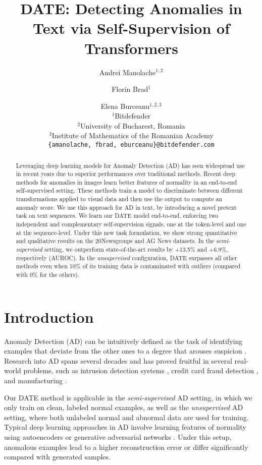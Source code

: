 \documentclass[11pt]{article}
\title{DATE: Detecting Anomalies in Text via Self-Supervision of Transformers}
\author{Andrei Manolache$^{1, 2}$ \and Florin Brad$^{1}$ \and Elena Burceanu$^{1, 2, 3}$ \\
        $^1$Bitdefender\\
        $^2$University of Bucharest, Romania\\
        $^3$Institute of Mathematics of the Romanian Academy\\
        \texttt{\{amanolache, fbrad, eburceanu\}@bitdefender.com}\\ }
\begin{document}
\maketitle

\begin{abstract}
Leveraging deep learning models for Anomaly Detection (AD) has seen widespread use in recent years due to superior performances over traditional methods. Recent deep methods for anomalies in images learn better features of normality in an end-to-end self-supervised setting. These methods train a model to discriminate between different transformations applied to visual data and then use the output to compute an anomaly score. We use this approach for AD in text, by introducing a novel pretext task on text sequences. We learn our DATE model end-to-end, enforcing two independent and complementary self-supervision signals, one at the token-level and one at the sequence-level. Under this new task formulation, we show strong quantitative and qualitative results on the 20Newsgroups and AG News datasets. In the \emph{semi-supervised} setting, we outperform state-of-the-art results by +13.5\% and +6.9\%, respectively (AUROC). In the \emph{unsupervised} configuration, DATE surpasses all other methods even when 10\% of its training data is contaminated with outliers (compared with 0\% for the others).

\end{abstract}


\section{Introduction}
Anomaly Detection (AD) can be intuitively defined as the task of identifying examples that deviate from the other ones to a degree that arouses suspicion \cite{Hawkins1980}. Research into AD spans several decades \cite{Chandola2009,Aggarwal2015} and has proved fruitful in several real-world problems, such as intrusion detection systems \cite{Banoth2017}, credit card fraud detection \cite{Dorronsoro1997}, and manufacturing \cite{Kammerer2019}.

Our DATE method is applicable in the \emph{semi-supervised} AD setting, in which we only train on clean, labeled normal examples, as well as the \emph{unsupervised} AD setting, where both unlabeled normal and abnormal data are used for training. Typical deep learning approaches in AD involve learning features of normality using autoencoders \cite{Hawkins2002,Sakurada2014,Chen2017} or generative adversarial networks \cite{Schlegl2017}. Under this setup, anomalous examples lead to a higher reconstruction error or differ significantly compared with generated samples.
\end{document}
